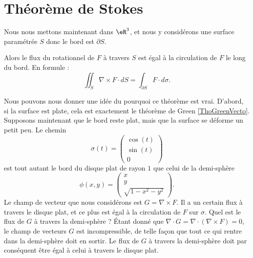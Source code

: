\section{Théorème de Stokes}

Nous nous mettons maintenant dans $\eR^3$, et nous y considérons une surface paramétrée $S$ donc le bord est $\partial S$. 

\begin{theorem}     \label{THOooIRYTooFEyxif}
    Alors le flux du rotationnel de $F$ à travers $S$ est égal à la circulation de $F$ le long du bord. En formule :
    \begin{equation}
        \iint_S\nabla\times F\cdot dS=\int_{\partial S} F\cdot d\sigma.
    \end{equation}
\end{theorem}

Nous pouvons nous donner une idée du pourquoi ce théorème est vrai. D'abord, si la surface est plate, cela est exactement le théorème de Green \ref{ThoGreenVecto}. Supposons maintenant que le bord reste plat, mais que la surface se déforme un petit peu. Le chemin
\begin{equation}
    \sigma(t)=\begin{pmatrix}
        \cos(t)    \\ 
        \sin(t)    \\ 
        0    
    \end{pmatrix}
\end{equation}
est tout autant le bord du disque plat de rayon $1$ que celui de la demi-sphère
\begin{equation}
    \phi(x,y)=\begin{pmatrix}
        x    \\ 
        y    \\ 
        \sqrt{1-x^2-y^2}    
    \end{pmatrix}.
\end{equation}
Le champ de vecteur que nous considérons est $G=\nabla\times F$. Il a un certain flux à travers le disque plat, et ce plus est égal à la circulation de $F$ sur $\sigma$. Quel est le flux de $G$ à travers la demi-sphère ? Étant donné que $\nabla\cdot G=\nabla\cdot(\nabla\times F)=0$, le champ de vecteurs $G$ est incompressible, de telle façon que tout ce qui rentre dans la demi-sphère doit en sortir. Le flux de $G$ à travers la demi-sphère doit par conséquent être égal à celui à travers le disque plat.


